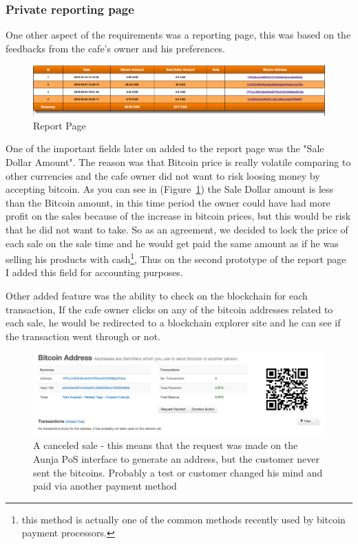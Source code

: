 \subsubsection{Private reporting page}
One other aspect of the requirements was a reporting page, this was based on the feedbacks from the cafe's owner and his preferences.

\begin{figure}[htb!p]
\centering
\includegraphics[width=\linewidth]{fig/report_page.png}
  \caption{Report Page}
\label{fig:report_page}
\end{figure}

One of the important fields later on added to the report page was the "Sale Dollar Amount". The reason was that Bitcoin price is really volatile comparing to other currencies and the cafe owner did not want to risk loosing money by accepting bitcoin. As you can see in (Figure~\ref{fig:report_page}) the Sale Dollar amount is less than the Bitcoin amount, in this time period the owner could have had more profit on the sales because of the increase in bitcoin prices, but this would be risk that he did not want to take. So as an agreement, we decided to lock the price of each sale on the sale time and he would get paid the same amount as if he was selling his products with cash\footnote{this method is actually one of the common methods recently used by bitcoin payment processors.}, Thus on the second prototype of the report page I added this field for accounting purposes.

Other added feature was the ability to check on the blockchain for each transaction, If the cafe owner clicks on any of the bitcoin addresses related to each sale, he would be redirected to a blockchain explorer site and he can see if the transaction went through or not.

\begin{figure}[htb!p]
\centering
\includegraphics[width=\linewidth]{fig/canceled_sale.png}
  \caption{A canceled sale - this means that the request was made on the Aunja PoS interface to generate an address, but the customer never sent the bitcoins. Probably a test or customer changed his mind and paid via another payment method}
\label{fig:canceled_sale}
\end{figure}


